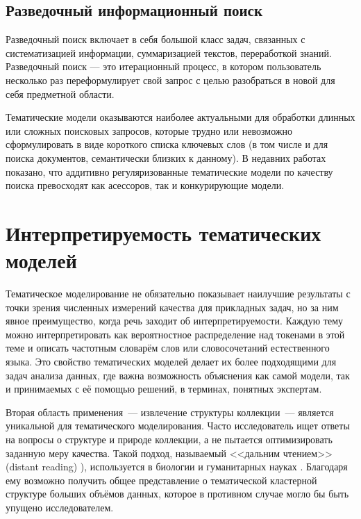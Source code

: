 \subsection{Разведочный информационный поиск}

Разведочный поиск включает в себя большой класс задач, связанных с систематизацией информации, суммаризацией текстов, переработкой знаний. Разведочный поиск --- это итерационный процесс, в котором пользователь несколько раз переформулирует свой запрос с целью разобраться в новой для себя предметной области.

Тематические модели оказываются наиболее актуальными для обработки длинных или сложных поисковых запросов, которые трудно  или невозможно сформулировать в виде короткого списка ключевых слов (в том числе и для поиска документов, семантически близких к данному). В недавних работах \cite{yanina17technews, ianina2019regularized} показано, что аддитивно регуляризованные тематические модели по качеству поиска превосходят как асессоров, так и конкурирующие модели.

\section{Интерпретируемость тематических моделей}

Тематическое моделирование не обязательно показывает наилучшие результаты с точки зрения численных измерений качества для прикладных задач, но за ним явное преимущество, когда речь заходит об интерпретируемости. Каждую тему можно интерпретировать как вероятностное распределение над токенами в этой теме и описать частотным словарём слов или словосочетаний естественного языка. Это свойство тематических моделей делает их более подходящими для задач анализа данных, где важна возможность объяснения как самой модели, так и принимаемых с её помощью решений, в терминах, понятных экспертам.

Вторая область применения~--- извлечение структуры коллекции~--- является уникальной для тематического моделирования. Часто исследователь ищет ответы на вопросы о структуре и природе коллекции, а не пытается оптимизировать заданную меру качества. Такой подход, называемый <<дальним чтением>> (distant reading) \cite{milkova2019distant}), используется в  биологии \cite{Liu2016,funnell2019integrated} и гуманитарных науках \cite{fntir2017applications,antons2019content}. Благодаря ему возможно получить общее представление о тематической кластерной структуре больших объёмов данных, которое в противном случае могло бы быть упущено исследователем.


